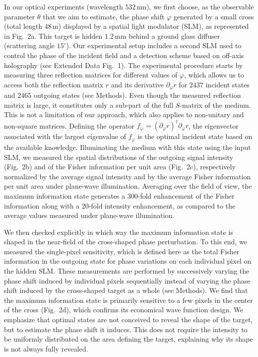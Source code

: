 \documentclass[aps,pra,twocolumn,amsmath,amssymb,superscriptaddress,10pt,nobibnotes]{revtex4-2}
\begin{document}
In our optical experiments (wavelength $532$\,nm), we first choose, as the observable parameter $\theta$ that we aim to estimate, the phase shift $\varphi$ generated by a small cross (total length $48$\,\textmu m) displayed by a spatial light modulator (SLM), as represented in Fig.~2a. This target is hidden $1.2$\,mm behind a ground glass diffuser (scattering angle $15^\circ$). Our experimental setup includes a second SLM used to control the phase of the incident field and a detection scheme based on off-axis holography (see Extended Data Fig.~1). The experimental procedure starts by measuring three reflection matrices for different values of $\varphi$, which allows us to access both the reflection matrix $r$ and its derivative $\partial_\varphi r$ for $2437$ incident states and $2465$ outgoing states (see Methods). Even though the measured reflection matrix is large, it constitutes only a sub-part of the full $S$-matrix of the medium. This is not a limitation of our approach, which also applies to non-unitary and non-square matrices. Defining the operator $f_\varphi=(\partial_\varphi r)^\dagger \partial_\varphi r$, the eigenvector associated with the largest eigenvalue of $f_\varphi$ is the optimal incident state based on the available knowledge. Illuminating the medium with this state using the input SLM, we measured the spatial distributions of the outgoing signal intensity (Fig.~2b) and of the Fisher information per unit area (Fig.~2c), respectively normalized by the average signal intensity and by the average Fisher information per unit area under plane-wave illumination. Averaging over the field of view, the maximum information state generates a $300$-fold enhancement of the Fisher information along with a $20$-fold intensity enhancement, as compared to the average values measured under plane-wave illumination.

We then checked explicitly in which way the maximum information state is shaped in the near-field of the cross-shaped phase perturbation. To this end, we measured the single-pixel sensitivity, which is defined here as the total Fisher information in the outgoing state for phase variations on each individual pixel on the hidden SLM. These measurements are performed by successively varying the phase shift induced by individual pixels sequentially instead of varying the phase shift induced by the cross-shaped target as a whole (see Methods). We find that the maximum information state is primarily sensitive to a few pixels in the center of the cross (Fig.~2d), which confirms its economical wave function design. We emphasize that optimal states are not conceived to reveal the shape of the target, but to estimate the phase shift it induces. This does not require the intensity to be uniformly distributed on the area defining the target, explaining why its shape is not always fully revealed.
\end{document}
